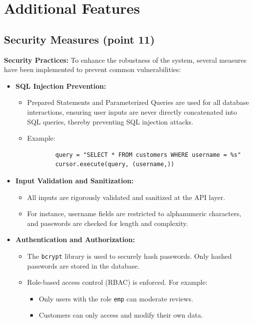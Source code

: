 \documentclass[a4paper,12pt]{article}
\begin{document}
\section{Additional Features}

\subsection{Security Measures (point 11)}
\textbf{Security Practices:} To enhance the robustness of the system, several measures have been implemented to prevent common vulnerabilities:

\begin{itemize}
    \item \textbf{SQL Injection Prevention:}
    \begin{itemize}
        \item Prepared Statements and Parameterized Queries are used for all database interactions, ensuring user inputs are never directly concatenated into SQL queries, thereby preventing SQL injection attacks.
        \item Example:
        \begin{verbatim}
        query = "SELECT * FROM customers WHERE username = %s"
        cursor.execute(query, (username,))
        \end{verbatim}
    \end{itemize}

    \item \textbf{Input Validation and Sanitization:}
    \begin{itemize}
        \item All inputs are rigorously validated and sanitized at the API layer. 
        \item For instance, username fields are restricted to alphanumeric characters, and passwords are checked for length and complexity.
    \end{itemize}

    \item \textbf{Authentication and Authorization:}
    \begin{itemize}
        \item The \texttt{bcrypt} library is used to securely hash passwords. Only hashed passwords are stored in the database.
        \item Role-based access control (RBAC) is enforced. For example:
        \begin{itemize}
            \item Only users with the role \texttt{emp} can moderate reviews.
            \item Customers can only access and modify their own data.
        \end{itemize}
    \end{itemize}


\end{itemize}
\end{document}
